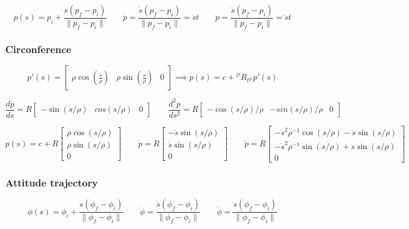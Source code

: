 $$
p(s) = p_i + \frac{s(p_f - p_i)}{\|p_f - p_i\|}
\qquad
\dot{p} = \frac{\dot{s}(p_f - p_i)}{\|p_f - p_i\|} = \dot{s}t
\qquad
\ddot{p} = \frac{\ddot{s}(p_f - p_i)}{\|p_f - p_i\|} = \ddot{s}t
$$

\subsubsection{Circonference}
$$
p'(s)
=
\begin{bmatrix}
	\rho \cos(\frac{s}{\rho}) &
	\rho \sin(\frac{s}{\rho}) &
	0
\end{bmatrix}
\implies
p(s) = c + {}^\mathcal{O}R_{\mathcal{O}'} p'(s)
$$

$$
\frac{dp}{ds} = R 
\begin{bmatrix} -\sin(s/\rho) & cos(s/\rho) & 0 \end{bmatrix}
\qquad
\frac{d^2p}{ds^2} = R 
\begin{bmatrix} -\cos(s/\rho)/\rho & -sin(s/\rho)/\rho & 0 \end{bmatrix}
$$

$$
p(s) 
= 
c + R \begin{bmatrix} \rho \cos(s/\rho) \\ \rho \sin(s/\rho) \\ 0 \end{bmatrix}
\qquad
\dot{p}
=
R \begin{bmatrix} - \dot{s} \sin(s/\rho) \\ \dot{s} \sin(s/\rho) \\ 0 \end{bmatrix}
\qquad
\ddot{p}
=
R \begin{bmatrix} 
	- \dot{s}^2 \rho^{-1} \cos(s/\rho) - \ddot{s} \sin(s/\rho) \\ 
	- \dot{s}^2 \rho^{-1} \sin(s/\rho) + \ddot{s} \sin(s/\rho) 
	\\ 0 
\end{bmatrix}
$$

\subsubsection{Attitude trajectory}
$$
\phi(s) = \phi_i + \frac{s(\phi_f - \phi_i)}{\|\phi_f - \phi_i\|}
\qquad
\dot{\phi} = \frac{\dot{s}(\phi_f - \phi_i)}{\|\phi_f - \phi_i\|}
\qquad
\ddot{\phi} = \frac{\ddot{s}(\phi_f - \phi_i)}{\|\phi_f - \phi_i\|}
$$
